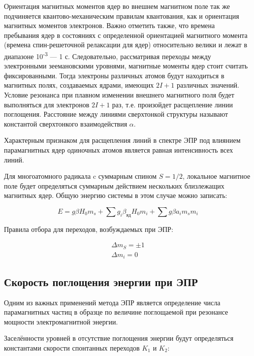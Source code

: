 \documentclass{article}
\begin{document}
Ориентация магнитных моментов ядер во внешнем магнитном поле так же подчиняется квантово-механическим правилам квантования, как и ориентация магнитных моментов электронов. Важно отметить также, что времена пребывания ядер в состояниях с определенной ориентацией магнитного момента (времена спин-решеточной релаксации для ядер) относительно велики и лежат в диапазоне 10\textsuperscript{-3} --- 1 с. Следовательно, рассматривая переходы между электронными зеемановскими уровнями, магнитные моменты ядер стоит считать фиксированными. Тогда электроны различных атомов будут находиться в магнитных полях, создаваемых ядрами, имеющих $2I + 1$ различных значений. Условие резонанса при плавном изменении внешнего магнитного поля будет выполняться для электронов $2I + 1$ раз, т.е. произойдет расщепление линии поглощения. Расстояние между линиями сверхтонкой структуры называют константой сверхтонкого взаимодействия $ \alpha $.

Характерным признаком для расщепления линий в спектре ЭПР под влиянием парамагнитных ядер одиночных атомов является равная интенсивность всех линий.

Для многоатомного радикала c суммарным спином $S = 1/2$, локальное магнитное поле будет определяться суммарным действием нескольких близлежащих магнитных ядер. Общую энергию системы в этом случае можно записать:

\begin{equation}
E = g \beta H_{0}m_{s}+ \sum g_{i} \beta _{яд}H_{0}m_{i} + \sum g \beta a_{i}m_{s}m_{i}
\end{equation}

Правила отбора для переходов, возбуждаемых при ЭПР:

\begin{equation}
\begin{aligned}
\Delta m_{S}= \pm 1 \\
\Delta m_{i} = 0
\end{aligned}
\end{equation}

\subsection{Скорость поглощения энергии при ЭПР}

Одним из важных применений метода ЭПР является определение числа парамагнитных частиц в образце по величине поглощаемой при резонансе мощности электромагнитной энергии.

Заселённости уровней в отсутствие поглощения энергии будут определяться константами скорости спонтанных переходов $K_{1}$ и $K_{2}$:
\end{document}
